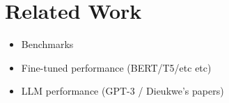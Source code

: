 \section{Related Work}

\begin{itemize}
  \item Benchmarks
  \item Fine-tuned performance (BERT/T5/etc etc)
  \item LLM performance (GPT-3 / Dieukwe's papers)
\end{itemize}
